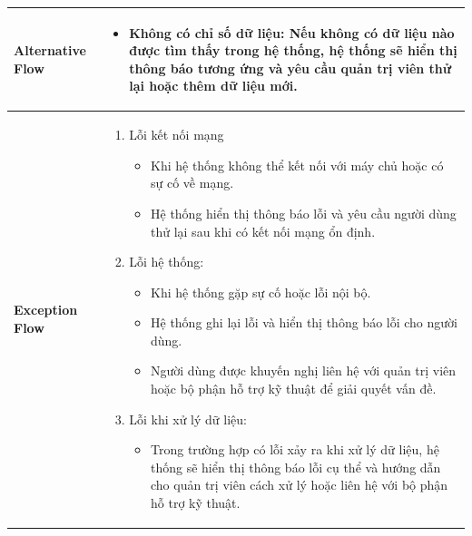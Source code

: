 \begin{longtable}[H]{|l|p{}|}
        \hline
        
        \textbf{Alternative Flow} & \vspace{-1cm} \begin{itemize}[leftmargin=4mm]
            \item Không có chỉ số dữ liệu: Nếu không có dữ liệu nào được tìm thấy trong hệ thống, hệ thống sẽ hiển thị thông báo tương ứng và yêu cầu quản trị viên thử lại hoặc thêm dữ liệu mới.
        \end{itemize} \\
        
        \hline
        
        \textbf{Exception Flow} & \vspace{-1cm} \begin{enumerate}[leftmargin=5.5mm]
            \setlength\itemsep{0em}
            \item Lỗi kết nối mạng
                \begin{itemize}
                    \setlength\itemsep{0em}
                    \item Khi hệ thống không thể kết nối với máy chủ hoặc có sự cố về mạng.
                    \item Hệ thống hiển thị thông báo lỗi và yêu cầu người dùng thử lại sau khi có kết nối mạng ổn định.
                \end{itemize}
            \item Lỗi hệ thống:
                \begin{itemize}
                    \setlength\itemsep{0em}
                    \item Khi hệ thống gặp sự cố hoặc lỗi nội bộ.
                    \item Hệ thống ghi lại lỗi và hiển thị thông báo lỗi cho người dùng.
                    \item Người dùng được khuyến nghị liên hệ với quản trị viên hoặc bộ phận hỗ trợ kỹ thuật để giải quyết vấn đề.
                \end{itemize}
            \item Lỗi khi xử lý dữ liệu: 
                \begin{itemize}
                    \setlength\itemsep{0em}
                    \item Trong trường hợp có lỗi xảy ra khi xử lý dữ liệu, hệ thống sẽ hiển thị thông báo lỗi cụ thể và hướng dẫn cho quản trị viên cách xử lý hoặc liên hệ với bộ phận hỗ trợ kỹ thuật.
                \end{itemize}
        \end{enumerate}\\
        \hline 
    \end{longtable}

